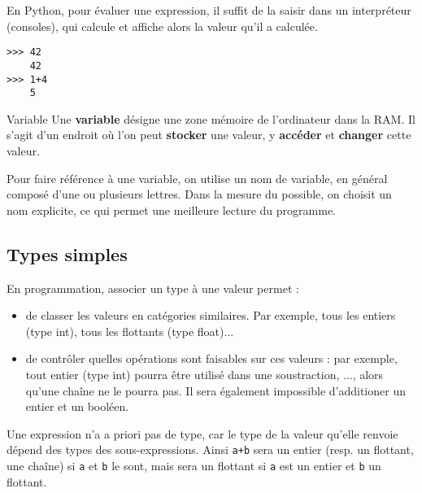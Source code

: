 En Python, pour évaluer une expression, il suffit de la saisir dans un interpréteur (consoles), qui
calcule et affiche alors la valeur qu'il a calculée.
\begin{lstlisting}
>>> 42
	42
>>> 1+4
	5
\end{lstlisting}



\begin{defi}{Variable}
Une \textbf{variable} désigne une zone mémoire de l'ordinateur dans la RAM.
Il s'agit d'un endroit où l'on peut \textbf{stocker} une valeur, y \textbf{accéder} et 
\textbf{changer} cette valeur.

Pour faire référence à une variable, on utilise un nom de variable, en général composé d'une ou 
plusieurs lettres. Dans la mesure du possible, on choisit un nom explicite, ce qui permet une 
meilleure lecture du programme.
\end{defi}





\subsection{Types simples}

En programmation, associer un type à une valeur permet :
\begin{itemize}
\item de classer les valeurs en catégories similaires. Par exemple, tous les
entiers (type int), tous les flottants (type float)...
\item de contrôler quelles opérations sont faisables sur ces valeurs : par
exemple, tout entier (type int) pourra être utilisé dans une soustraction, ..., alors 
qu'une chaîne ne le pourra pas. Il sera également impossible d'additioner un entier et un booléen. 
                                     
\end{itemize}

Une expression n'a a priori pas de type, car le type de la valeur qu'elle renvoie dépend des types 
des sous-expressions. Ainsi \texttt{a+b} sera un entier (resp. un flottant, une chaîne) si 
\texttt{a} et \texttt{b} le sont, mais sera un flottant si \texttt{a} est un entier et \texttt{b} 
un flottant.


